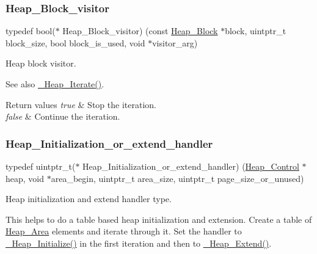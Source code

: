 \subsubsection{\texorpdfstring{Heap\_Block\_visitor}{Heap\_Block\_visitor}}
{\footnotesize\ttfamily typedef bool($\ast$ Heap\+\_\+\+Block\+\_\+visitor) (const \mbox{\hyperlink{structHeap__Block}{Heap\+\_\+\+Block}} $\ast$block, uintptr\+\_\+t block\+\_\+size, bool block\+\_\+is\+\_\+used, void $\ast$visitor\+\_\+arg)}



Heap block visitor. 

\begin{DoxySeeAlso}{See also}
\mbox{\hyperlink{group__RTEMSScoreHeap_ga568d8a3b62e8b4b060940770bdeee254}{\+\_\+\+Heap\+\_\+\+Iterate()}}.
\end{DoxySeeAlso}

\begin{DoxyRetVals}{Return values}
{\em true} & Stop the iteration. \\
\hline
{\em false} & Continue the iteration. \\
\hline
\end{DoxyRetVals}
\mbox{\label{group__RTEMSScoreHeap_ga8953b692d39ca1c8a2780e9e8e2d9b1f}} 
\subsubsection{\texorpdfstring{Heap\_Initialization\_or\_extend\_handler}{Heap\_Initialization\_or\_extend\_handler}}
{\footnotesize\ttfamily typedef uintptr\+\_\+t($\ast$ Heap\+\_\+\+Initialization\+\_\+or\+\_\+extend\+\_\+handler) (\mbox{\hyperlink{structHeap__Control}{Heap\+\_\+\+Control}} $\ast$heap, void $\ast$area\+\_\+begin, uintptr\+\_\+t area\+\_\+size, uintptr\+\_\+t page\+\_\+size\+\_\+or\+\_\+unused)}



Heap initialization and extend handler type. 

This helps to do a table based heap initialization and extension. Create a table of \mbox{\hyperlink{structHeap__Area}{Heap\+\_\+\+Area}} elements and iterate through it. Set the handler to \mbox{\hyperlink{group__RTEMSScoreHeap_gac5974c7ccf84c152ba6c8e17bea3ca5f}{\+\_\+\+Heap\+\_\+\+Initialize()}} in the first iteration and then to \mbox{\hyperlink{group__RTEMSScoreHeap_ga7484f40d81ae26a7f5b3773a2dd006be}{\+\_\+\+Heap\+\_\+\+Extend()}}.

